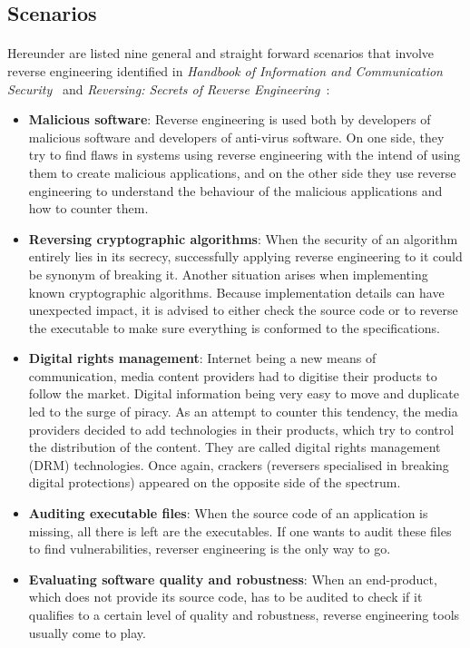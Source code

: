 \subsection{Scenarios}
\paragraph{}
Hereunder are listed nine general and straight forward scenarios that involve reverse engineering identified in \textit{Handbook of Information and Communication Security}~\cite{cipresso2010software} and \textit{Reversing: Secrets of Reverse Engineering}~\cite{eilam2005reversing}:
\begin{itemize}
	\item \textbf{Malicious software}: Reverse engineering is used both by developers of malicious software and developers of anti-virus software. On one side, they try to find flaws in systems using reverse engineering with the intend of using them to create malicious applications, and on the other side they use reverse engineering to understand the behaviour of the malicious applications and how to counter them.
	\item \textbf{Reversing cryptographic algorithms}: When the security of an algorithm entirely lies in its secrecy, successfully applying reverse engineering to it could be synonym of breaking it. Another situation arises when implementing known cryptographic algorithms. Because implementation details can have unexpected impact, it is advised to either check the source code or to reverse the executable to make sure everything is conformed to the specifications.
	\item \textbf{Digital rights management}: Internet being a new means of communication, media content providers had to digitise their products to follow the market. Digital information being very easy to move and duplicate led to the surge of piracy. As an attempt to counter this tendency, the media providers decided to add technologies in their products, which try to control the distribution of the content. They are called digital rights management (DRM) technologies. Once again, crackers (reversers specialised in breaking digital protections) appeared on the opposite side of the spectrum.
	\item \textbf{Auditing executable files}: When the source code of an application is missing, all there is left are the executables. If one wants to audit these files to find vulnerabilities, reverser engineering is the only way to go.
	\item \textbf{Evaluating software quality and robustness}: When an end-product, which does not provide its source code, has to be audited to check if it qualifies to a certain level of quality and robustness, reverse engineering tools usually come to play.

\end{itemize}
